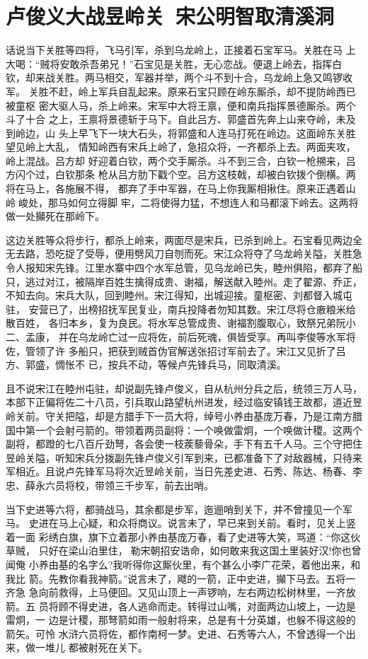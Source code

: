 \chapter{卢俊义大战昱岭关~宋公明智取清溪洞}

话说当下关胜等四将，飞马引军，杀到乌龙岭上，正接着石宝军马。关胜在马
上大喝：“贼将安敢杀吾弟兄！”石宝见是关胜，无心恋战。便退上岭去，指挥白
钦，却来战关胜。两马相交，军器并举，两个斗不到十合，乌龙岭上急又鸣锣收军。
关胜不赶，岭上军兵自乱起来。原来石宝只顾在岭东厮杀，却不提防岭西已被童枢
密大驱人马，杀上岭来。宋军中大将王禀，便和南兵指挥景德厮杀。两个斗了十合
之上，王禀将景德斩于马下。自此吕方、郭盛首先奔上山来夺岭，未及到岭边，山
头上早飞下一块大石头，将郭盛和人连马打死在岭边。这面岭东关胜望见岭上大乱，
情知岭西有宋兵上岭了，急招众将，一齐都杀上去。两面夹攻，岭上混战。吕方却
好迎着白钦，两个交手厮杀。斗不到三合，白钦一枪搠来，吕方闪个过，白钦那条
枪从吕方肋下戳个空。吕方这枝戟，却被白钦拨个倒横。两将在马上，各施展不得，
都弃了手中军器，在马上你我厮相揪住。原来正遇着山岭峻处，那马如何立得脚
牢，二将使得力猛，不想连人和马都滚下岭去。这两将做一处攧死在那岭下。

这边关胜等众将步行，都杀上岭来，两面尽是宋兵，已杀到岭上。石宝看见两边全
无去路，恐吃捉了受辱，便用劈风刀自刎而死。宋江众将夺了乌龙岭关隘，关胜急
令人报知宋先锋。江里水寨中四个水军总管，见乌龙岭已失，睦州俱陷，都弃了船
只，逃过对江，被隔岸百姓生擒得成贵、谢福，解送献入睦州。走了翟源、乔正，
不知去向。宋兵大队，回到睦州。宋江得知，出城迎接。童枢密、刘都督入城屯驻，
安营已了，出榜招抚军民复业，南兵投降者勿知其数。宋江尽将仓廒粮米给散百姓，
各归本乡，复为良民。将水军总管成贵、谢福割腹取心，致祭兄弟阮小二、孟康，
并在乌龙岭亡过一应将佐，前后死魂，俱皆受享。再叫李俊等水军将佐，管领了许
多船只，把获到贼首伪官解送张招讨军前去了。宋江又见折了吕方、郭盛，惆怅不
已，按兵不动，等候卢先锋兵马，同取清溪。

且不说宋江在睦州屯驻，却说副先锋卢俊义，自从杭州分兵之后，统领三万人马，
本部下正偏将佐二十八员，引兵取山路望杭州进发，经过临安镇钱王故都，道近昱
岭关前。守关把隘，却是方腊手下一员大将，绰号小养由基庞万春，乃是江南方腊
国中第一个会射弓箭的。带领着两员副将：一个唤做雷炯，一个唤做计稷。这两个
副将，都蹬的七八百斤劲弩，各会使一枝蒺藜骨朵，手下有五千人马。三个守把住
昱岭关隘，听知宋兵分拨副先锋卢俊义引军到来，已都准备下了对敌器械，只待来
军相近。且说卢先锋军马将次近昱岭关前，当日先差史进、石秀、陈达、杨春、李
忠、薛永六员将校，带领三千步军，前去出哨。

当下史进等六将，都骑战马，其余都是步军，迤逦哨到关下，并不曾撞见一个军马。
史进在马上心疑，和众将商议。说言未了，早已来到关前。看时，见关上竖着一面
彩绣白旗，旗下立着那小养由基庞万春，看了史进等大笑，骂道：“你这伙草贼，
只好在梁山泊里住，勒宋朝招安诰命，如何敢来我这国土里装好汉!你也曾闻俺
小养由基的名字么?我听得你这厮伙里，有个甚么小李广花荣，着他出来，和我比
箭。先教你看我神箭。”说言未了，飕的一箭，正中史进，攧下马去。五将一齐急
急向前救得，上马便回。又见山顶上一声锣响，左右两边松树林里，一齐放箭。五
员将顾不得史进，各人逃命而走。转得过山嘴，对面两边山坡上，一边是雷炯，一
边是计稷，那弩箭如雨一般射将来，总是有十分英雄，也躲不得这般的箭矢。可怜
水浒六员将佐，都作南柯一梦。史进、石秀等六人，不曾透得一个出来，做一堆儿
都被射死在关下。


